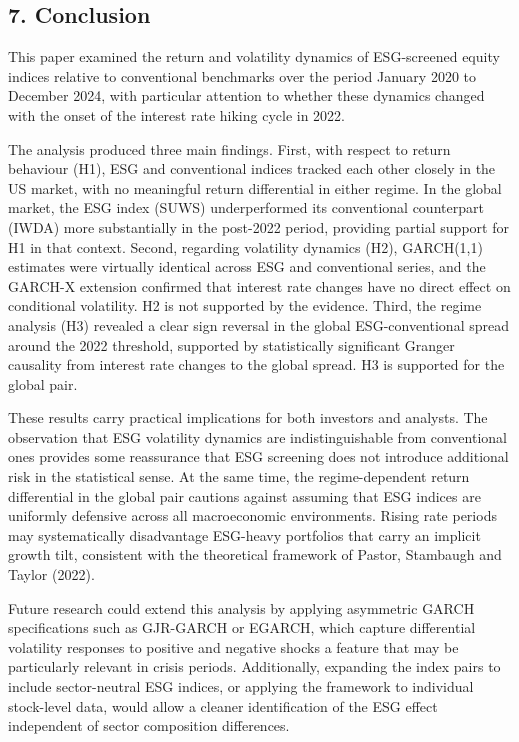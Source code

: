 \documentclass[
]{article}
\begin{document}
\subsection{7. Conclusion}\label{conclusion}

This paper examined the return and volatility dynamics of ESG-screened
equity indices relative to conventional benchmarks over the period
January 2020 to December 2024, with particular attention to whether
these dynamics changed with the onset of the interest rate hiking cycle
in 2022.

The analysis produced three main findings. First, with respect to return
behaviour (H1), ESG and conventional indices tracked each other closely
in the US market, with no meaningful return differential in either
regime. In the global market, the ESG index (SUWS) underperformed its
conventional counterpart (IWDA) more substantially in the post-2022
period, providing partial support for H1 in that context. Second,
regarding volatility dynamics (H2), GARCH(1,1) estimates were virtually
identical across ESG and conventional series, and the GARCH-X extension
confirmed that interest rate changes have no direct effect on
conditional volatility. H2 is not supported by the evidence. Third, the
regime analysis (H3) revealed a clear sign reversal in the global
ESG-conventional spread around the 2022 threshold, supported by
statistically significant Granger causality from interest rate changes
to the global spread. H3 is supported for the global pair.

These results carry practical implications for both investors and
analysts. The observation that ESG volatility dynamics are
indistinguishable from conventional ones provides some reassurance that
ESG screening does not introduce additional risk in the statistical
sense. At the same time, the regime-dependent return differential in the
global pair cautions against assuming that ESG indices are uniformly
defensive across all macroeconomic environments. Rising rate periods may
systematically disadvantage ESG-heavy portfolios that carry an implicit
growth tilt, consistent with the theoretical framework of Pastor,
Stambaugh and Taylor (2022).

Future research could extend this analysis by applying asymmetric GARCH
specifications such as GJR-GARCH or EGARCH, which capture differential
volatility responses to positive and negative shocks a feature that may
be particularly relevant in crisis periods. Additionally, expanding the
index pairs to include sector-neutral ESG indices, or applying the
framework to individual stock-level data, would allow a cleaner
identification of the ESG effect independent of sector composition
differences.
\end{document}
